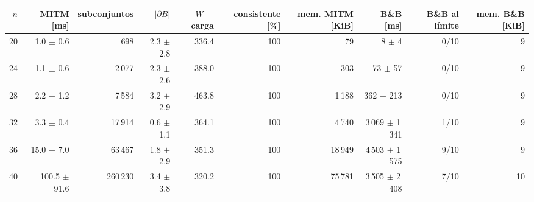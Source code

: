\begin{tabular}{rrrrrrrrrr}
\toprule
$n$ & MITM [ms] & subconjuntos & $|\partial B|$ & $W-$carga & consistente [\%] & mem. MITM [KiB] & B\&B [ms] & B\&B al límite & mem. B\&B [KiB] \\
\midrule
20 & 1.0 $\pm$ 0.6 & 698 & 2.3 $\pm$ 2.8 & 336.4 & 100 & 79 & 8 $\pm$ 4 & 0/10 & 9 \\
24 & 1.1 $\pm$ 0.6 & 2\,077 & 2.3 $\pm$ 2.6 & 388.0 & 100 & 303 & 73 $\pm$ 57 & 0/10 & 9 \\
28 & 2.2 $\pm$ 1.2 & 7\,584 & 3.2 $\pm$ 2.9 & 463.8 & 100 & 1\,188 & 362 $\pm$ 213 & 0/10 & 9 \\
32 & 3.3 $\pm$ 0.4 & 17\,914 & 0.6 $\pm$ 1.1 & 364.1 & 100 & 4\,740 & 3\,069 $\pm$ 1\,341 & 1/10 & 9 \\
36 & 15.0 $\pm$ 7.0 & 63\,467 & 1.8 $\pm$ 2.9 & 351.3 & 100 & 18\,949 & 4\,503 $\pm$ 1\,575 & 9/10 & 9 \\
40 & 100.5 $\pm$ 91.6 & 260\,230 & 3.4 $\pm$ 3.8 & 320.2 & 100 & 75\,781 & 3\,505 $\pm$ 2\,408 & 7/10 & 10 \\
\bottomrule
\end{tabular}
